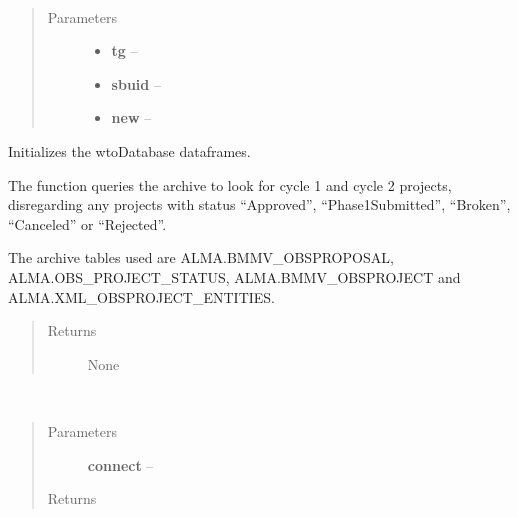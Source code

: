 \documentclass[a4paper,10pt,english]{sphinxmanual}
\begin{document}
\begin{fulllineitems}
\begin{fulllineitems}
\label{wtoapi:wtoDatabase.WtoDatabase.row_target}~\begin{quote}\begin{description}
\item[{Parameters}] \leavevmode\begin{itemize}
\item {} 
\textbf{tg} -- 

\item {} 
\textbf{sbuid} -- 

\item {} 
\textbf{new} -- 

\end{itemize}

\end{description}\end{quote}

\end{fulllineitems}


\begin{fulllineitems}
\label{wtoapi:wtoDatabase.WtoDatabase.start_wto}
Initializes the wtoDatabase dataframes.

The function queries the archive to look for cycle 1 and cycle 2
projects, disregarding any projects with status ``Approved'',
``Phase1Submitted'', ``Broken'', ``Canceled'' or ``Rejected''.

The archive tables used are ALMA.BMMV\_OBSPROPOSAL,
ALMA.OBS\_PROJECT\_STATUS, ALMA.BMMV\_OBSPROJECT and
ALMA.XML\_OBSPROJECT\_ENTITIES.
\begin{quote}\begin{description}
\item[{Returns}] \leavevmode
None

\end{description}\end{quote}

\end{fulllineitems}


\begin{fulllineitems}
\label{wtoapi:wtoDatabase.WtoDatabase.update}~\begin{quote}\begin{description}
\item[{Parameters}] \leavevmode
\textbf{connect} -- 

\item[{Returns}] \leavevmode


\end{description}\end{quote}

\end{fulllineitems}


\end{fulllineitems}
\end{document}
